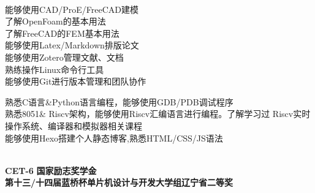 \documentclass{ctexart}
\begin{document}
\begin{center}
    \hrulefill \\
    \begin{minipage}[t]{18em}
        \textbullet 能够使用CAD/ProE/FreeCAD建模\\
        \textbullet 了解OpenFoam的基本用法 \\
        \textbullet 了解FreeCAD的FEM基本用法\\
        \textbullet 能够使用Latex/Markdown排版论文 \\
        \textbullet 能够使用Zotero管理文献、文档 \\
        \textbullet 熟练操作Linux命令行工具 \\
        \textbullet 能够使用Git进行版本管理和团队协作 \\
        
    \end{minipage}
    \quad 
    \begin{minipage}[t]{18em}
        \textbullet 熟悉C语言\&Python语言编程，能够使用GDB/PDB调试程序 \\
        \textbullet 熟悉8051\& Riscv架构，能够使用Riscv汇编语言进行编程。了解学习过
                    Riscv实时操作系统、编译器和模拟器相关课程 \\
        \textbullet 能够使用Hexo搭建个人静态博客,熟悉HTML/CSS/JS语法
    \end{minipage} 
        
    \end{center}

\begin{center}
    \hrulefill \\
    \textbullet \textbf{CET-6 } \qquad 
    \textbullet \textbf{国家励志奖学金}\\
    \textbullet \textbf{第十三/十四届蓝桥杯单片机设计与开发大学组辽宁省二等奖}
\end{center}
\end{document}
